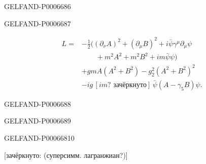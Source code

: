 \begin{GelfandAdjacentEvidence}{GELFAND-P000668}{6}

\end{GelfandAdjacentEvidence}
\begin{GelfandAdjacentEvidence}{GELFAND-P000668}{7}

\[
\begin{aligned}
L={}&-\tfrac12\bigl((\partial_\nu A)^2+(\partial_\mu B)^2
+i\bar\psi\gamma^\mu\partial_\mu\psi\\
&\qquad +m^2A^2+m^2B^2+im\bar\psi\psi\bigr)\\
&+gmA(A^2+B^2)-g_2^2(A^2+B^2)^2\\
&-ig\,[im\text{? зачёркнуто}]\,\bar\psi(A-\gamma_5B)\psi.
\end{aligned}
\]
\end{GelfandAdjacentEvidence}
\begin{GelfandAdjacentEvidence}{GELFAND-P000668}{8}

\end{GelfandAdjacentEvidence}
\begin{GelfandAdjacentEvidence}{GELFAND-P000668}{9}

\end{GelfandAdjacentEvidence}
\begin{GelfandAdjacentEvidence}{GELFAND-P000668}{10}


[зачёркнуто: (суперсимм. лагранжиан?)]
\end{GelfandAdjacentEvidence}



